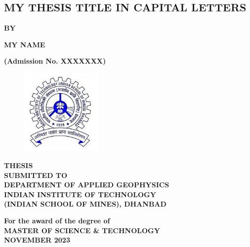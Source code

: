 \documentclass[12pt]{article}
\begin{document}
\begin{titlepage}
\begin{center}
   \section*{\fontsize{24}{24}\selectfont MY THESIS TITLE IN CAPITAL LETTERS}
   

\textbf{BY}

\textbf{\fontsize{14}{16}\selectfont MY NAME}

\textbf{\fontsize{14}{16}\selectfont (Admission No. XXXXXXX)}


\begin{figure}[H]
    \centering
    \includegraphics[width=4cm]{ismlogo.jpg}
   
    \label{fig:enter-labe2l}
\end{figure}

\textbf{\fontsize{14}{16}\selectfont THESIS\\ SUBMITTED TO\\
DEPARTMENT OF APPLIED GEOPHYSICS\\
INDIAN INSTITUTE OF TECHNOLOGY\\
(INDIAN SCHOOL OF MINES), DHANBAD\\}


\vspace{1cm}

\textbf{\fontsize{14}{16}\selectfont For the award of the degree of\\
MASTER OF SCIENCE \& TECHNOLOGY\\   %
NOVEMBER 2023}

\end{center}

\end{titlepage}
\restoregeometry %
\end{document}
